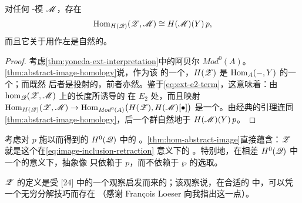 \begin{lemma}\label{thm:hom-abstract-image}
对任何 \trAinfty-模 $\mathscr{M}$，存在\trIsomorphism
\begin{equation*}
\operatorname{Hom}_{H(\mathscr{Q})}(\mathscr{Z},\mathscr{M})\cong H(\mathscr{M})(Y)\,p,
\end{equation*}
而且它关于用\trModule\trHomomorphism{}作左\trComposition{}是自然的。
\end{lemma}
\begin{proof}
考虑\cref{thm:yoneda-ext-interpretation}中的阿贝尔\trCategory{}%
$\mathit{Mod}^0(A)$。\cref{thm:abstract-image-homology}说，作为该\trCategory{}%
的一个\trObject，$H(\mathscr{Z})$ 是 $\operatorname{Hom}_A(-,Y)$ 的一个\trDirectSummand；而既然
后者是投射的，前者亦然。鉴于\eqref{eq:ext-e2-term}，这意味着：由
$\hom_{\mathscr{Q}}(\mathscr{Z},\mathscr{M})$ 上的长度\trFiltration{}所诱导的%
\trSpectralSequence{}在 $E_2$ 处\trDegenerate，而且映射
$\operatorname{Hom}_{H(\mathscr{Q})}(\mathscr{Z},\mathscr{M})\to
\operatorname{Hom}_{\mathit{Mod}^0(A)}\bigl(H(\mathscr{Z}),H(\mathscr{M})[\bullet]\bigr)$
是一个\trIsomorphism。由经典的\trYoneda{}引理连同%
\cref{thm:abstract-image-homology}，后一个\trGraded{}群自然地\trIsomorphic{}于
$H(\mathscr{M})(Y)\,p$。
\end{proof}

考虑对 $p$ 施以\trYonedaEmbedding{}而得到的 $H^0(\mathscr{Q})$ 中的%
\trIdempotent{}\trEndomorphism。\cref{thm:hom-abstract-image}直接蕴含：$\mathscr{Z}$
就是这个\trEndomorphism{}在\eqref{eq:image-inclusion-retraction} 意义下的%
\trImage。特别地，在相差 $H^0(\mathscr{Q})$ 中一个\trIsomorphism{}的意义下，抽象像
只依赖于 $p$，而不依赖于 $\wp$ 的选取。

\begin{remark}\label{thm:abstract-image-history}
$\mathscr{Z}$ 的定义是受 [24] 中的一个观察启发而来的；该观察说，在合适的%
\trComplex{}\trCategory{}中，\trDirectSummand{}可以凭一个无穷分解技巧而存在
（感谢 Fran\c{c}ois Loeser 向我指出这一点）。
\end{remark}
